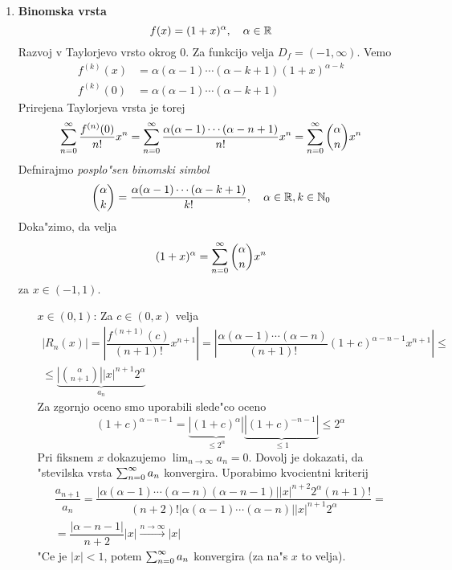 \begin{enumerate}
    \item \textbf{Binomska vrsta} 
    \begin{equation*}
    f(x) = (1 + x)^\alpha, \quad \alpha \in \mathbb{R}
    \end{equation*}
    Razvoj v Taylorjevo vrsto okrog 0. Za funkcijo velja $D_f = (-1, \infty)$. Vemo
    \begin{align*}
    f^{(k)}(x) &= \alpha (\alpha - 1) \cdots (\alpha - k + 1) (1 + x)^{\alpha - k} \\
    f^{(k)}(0) &= \alpha (\alpha - 1) \cdots (\alpha - k + 1)
    \end{align*}
    Prirejena Taylorjeva vrsta je torej
    \begin{equation*}
    \sum_{n = 0}^{\infty} \dfrac{f^{(n)}(0)}{n!} x^n = \sum_{n = 0}^{\infty} \dfrac{\alpha (\alpha -  1) \cdots (\alpha - n + 1)}{n!} x^n = \sum_{n = 0}^{\infty} \binom{\alpha}{n} x^n
    \end{equation*}
    Defnirajmo \emph{posplo"sen binomski simbol}
    \begin{equation*}
    \binom{\alpha}{k} = \dfrac{\alpha (\alpha - 1) \cdots (\alpha - k + 1)}{k!}, \quad \alpha \in \mathbb{R}, k \in \mathbb{N}_0
    \end{equation*}
    Doka"zimo, da velja
    \begin{equation*}
    (1 + x)^\alpha = \sum_{n = 0}^{\infty} \binom{\alpha}{n} x^n
    \end{equation*}
    za $x \in (-1, 1)$.
    \begin{itemize}
        \item[$x \in (0, 1)$:] Za $c \in (0, x)$ velja
        \begin{multline*}
        |R_n(x)| = \left| \dfrac{f^{(n+1)}(c)}{(n+1)!} x^{n+1} \right| = \left| \dfrac{\alpha (\alpha - 1) \cdots (\alpha - n)}{(n+1)!} (1+c)^{\alpha - n -1} x^{n+1}\right| \leq \\
        \leq \underbrace{\left| \binom{\alpha}{n + 1} \right| |x|^{n+1} 2^\alpha}_{a_n}
        \end{multline*}
        Za zgornjo oceno smo uporabili slede"co oceno
        \begin{equation*}
        (1+c)^{\alpha - n - 1} =\underbrace{ |(1+c)^\alpha |}_{\leq 2^\alpha} \underbrace{|(1 + c)^{-n -1}|}_{\leq 1} \leq 2^\alpha
        \end{equation*}
        Pri fiksnem $x$ dokazujemo $\lim_{n \to \infty} a_n = 0$. Dovolj je dokazati, da "stevilska vrsta $\sum_{n = 0}^{\infty} a_n$ konvergira. Uporabimo kvocientni kriterij
        \begin{multline*}
         \dfrac{a_{n+1}}{a_n} = \dfrac{|\alpha (\alpha - 1) \cdots (\alpha - n) (\alpha - n - 1)| |x|^{n+2} 2^\alpha (n+1)!}{(n+2)! |\alpha (\alpha - 1) \cdots (\alpha - n)| |x|^{n+1} 2^\alpha} = \\
         = \dfrac{|\alpha -n - 1|}{n+2} |x| \stackrel{n \to \infty}{\longrightarrow} |x|
        \end{multline*}
        "Ce je $|x| < 1$, potem $\sum_{n = 0}^{\infty} a_n$ konvergira (za na"s $x$ to velja).
        

\end{itemize}
\end{enumerate}
